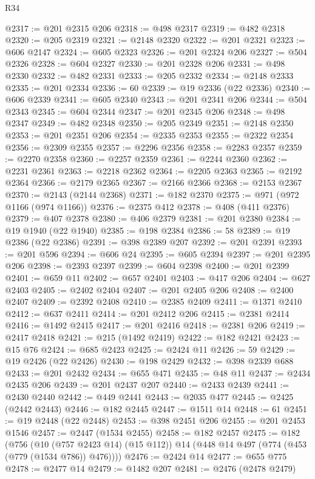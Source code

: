 \begin{lexlean}{R34}
\begin{coremodule}
@2317 := @201 @2315 @206
@2318 := @498 @2317
@2319 := @482 @2318
@2320 := @205 @2319
@2321 := @2148 @2320
@2322 := @201 @2321
@2323 := @606 @2147
@2324 := @605 @2323
@2326 := @201 @2324 @206
@2327 := @504 @2326
@2328 := @604 @2327
@2330 := @201 @2328 @206
@2331 := @498 @2330
@2332 := @482 @2331
@2333 := @205 @2332
@2334 := @2148 @2333
@2335 := @201 @2334
@2336 := 60
@2339 := @19 @2336 (@22 @2336)
@2340 := @606 @2339
@2341 := @605 @2340
@2343 := @201 @2341 @206
@2344 := @504 @2343
@2345 := @604 @2344
@2347 := @201 @2345 @206
@2348 := @498 @2347
@2349 := @482 @2348
@2350 := @205 @2349
@2351 := @2148 @2350
@2353 := @201 @2351 @206
@2354 := @2335 @2353
@2355 := @2322 @2354
@2356 := @2309 @2355
@2357 := @2296 @2356
@2358 := @2283 @2357
@2359 := @2270 @2358
@2360 := @2257 @2359
@2361 := @2244 @2360
@2362 := @2231 @2361
@2363 := @2218 @2362
@2364 := @2205 @2363
@2365 := @2192 @2364
@2366 := @2179 @2365
@2367 := @2166 @2366
@2368 := @2153 @2367
@2370 := @2143 (@2144 @2368)
@2371 := @182 @2370
@2375 := @971 (@972 @1166 (@974 @1166))
@2376 := @2375 @412
@2378 := @408 (@411 @2376)
@2379 := @407 @2378
@2380 := @406 @2379
@2381 := @201 @2380
@2384 := @19 @1940 (@22 @1940)
@2385 := @198 @2384
@2386 := 58
@2389 := @19 @2386 (@22 @2386)
@2391 := @398 @2389 @207
@2392 := @201 @2391
@2393 := @201 @596
@2394 := @606 @24
@2395 := @605 @2394
@2397 := @201 @2395 @206
@2398 := @2393 @2397
@2399 := @604 @2398
@2400 := @201 @2399
@2401 := @659 @11
@2402 := @657 @2401
@2403 := @417 @206
@2404 := @627 @2403
@2405 := @2402 @2404
@2407 := @201 @2405 @206
@2408 := @2400 @2407
@2409 := @2392 @2408
@2410 := @2385 @2409
@2411 := @1371 @2410
@2412 := @637 @2411
@2414 := @201 @2412 @206
@2415 := @2381 @2414
@2416 := @1492 @2415
@2417 := @201 @2416
@2418 := @2381 @206
@2419 := @2417 @2418
@2421 := @215 (@1492 @2419)
@2422 := @182 @2421
@2423 := @15 @76
@2424 := @685 @2423
@2425 := @2424 @11
@2426 := 59
@2429 := @19 @2426 (@22 @2426)
@2430 := @198 @2429
@2432 := @398 @2339 @688
@2433 := @201 @2432
@2434 := @655 @471
@2435 := @48 @11
@2437 := @2434 @2435 @206
@2439 := @201 @2437 @207
@2440 := @2433 @2439
@2441 := @2430 @2440
@2442 := @449 @2441
@2443 := @2035 @477
@2445 := @2425 (@2442 @2443)
@2446 := @182 @2445
@2447 := @1511 @14
@2448 := 61
@2451 := @19 @2448 (@22 @2448)
@2453 := @398 @2451 @206
@2455 := @201 @2453 @1546
@2457 := @2447 (@1534 @2455)
@2458 := @182 @2457
@2475 := @182
    (@756
      (@10 (@757 @2423 @14) (@15 @112))
      @14
      (@448 @14 @497 (@774 (@453 (@779 (@1534 @786)) @476))))
@2476 := @2424 @14
@2477 := @655 @775
@2478 := @2477 @14
@2479 := @1482 @207
@2481 := @2476 (@2478 @2479)

\end{coremodule}
\end{lexlean}
